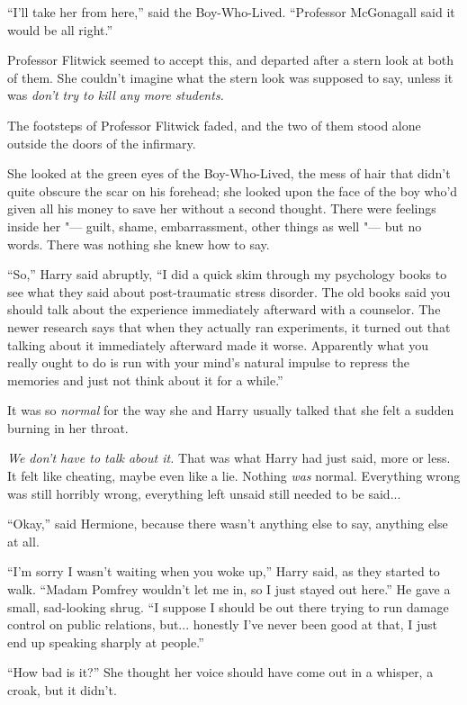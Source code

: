 ``I'll take her from here,'' said the Boy-Who-Lived. ``Professor
McGonagall said it would be all right.''

Professor Flitwick seemed to accept this, and departed after a stern
look at both of them. She couldn't imagine what the stern look was
supposed to say, unless it was \emph{don't try to kill any more
students.}

The footsteps of Professor Flitwick faded, and the two of them stood
alone outside the doors of the infirmary.

She looked at the green eyes of the Boy-Who-Lived, the mess of hair that
didn't quite obscure the scar on his forehead; she looked upon the face
of the boy who'd given all his money to save her without a second
thought. There were feelings inside her "--- guilt, shame, embarrassment,
other things as well "--- but no words. There was nothing she knew how to
say.

``So,'' Harry said abruptly, ``I did a quick skim through my psychology
books to see what they said about post-traumatic stress disorder. The
old books said you should talk about the experience immediately
afterward with a counselor. The newer research says that when they
actually ran experiments, it turned out that talking about it
immediately afterward made it worse. Apparently what you really ought to
do is run with your mind's natural impulse to repress the memories and
just not think about it for a while.''

It was so \emph{normal} for the way she and Harry usually talked that
she felt a sudden burning in her throat.

\emph{We don't have to talk about it.} That was what Harry had just
said, more or less. It felt like cheating, maybe even like a lie.
Nothing \emph{was} normal. Everything wrong was still horribly wrong,
everything left unsaid still needed to be said...

``Okay,'' said Hermione, because there wasn't anything else to say,
anything else at all.

``I'm sorry I wasn't waiting when you woke up,'' Harry said, as they
started to walk. ``Madam Pomfrey wouldn't let me in, so I just stayed
out here.'' He gave a small, sad-looking shrug. ``I suppose I should be
out there trying to run damage control on public relations, but...
honestly I've never been good at that, I just end up speaking sharply at
people.''

``How bad is it?'' She thought her voice should have come out in a
whisper, a croak, but it didn't.

